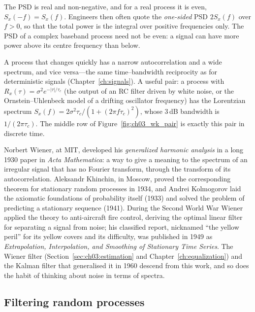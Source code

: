 The PSD is real and non-negative, and for a real process it is even, $S_x(-f)=S_x(f)$. Engineers then
often quote the \emph{one-sided} PSD $2S_x(f)$ over $f>0$, so that the total power is the integral over
positive frequencies only. The PSD of a complex baseband process need not be even: a signal can have
more power above its centre frequency than below.

A process that changes quickly has a narrow autocorrelation and a wide spectrum, and vice versa---the
same time--bandwidth reciprocity as for deterministic signals (Chapter~\ref{ch:signals}). A useful
pair: a process with $R_x(\tau)=\sigma^2e^{-|\tau|/\tau_c}$ (the output of an RC filter driven by white
noise, or the Ornstein--Uhlenbeck model of a drifting oscillator frequency) has the Lorentzian
spectrum $S_x(f)=2\sigma^2\tau_c/(1+(2\pi f\tau_c)^2)$, whose 3\,dB bandwidth is $1/(2\pi\tau_c)$. The
middle row of Figure~\ref{fig:ch03_wk_pair} is exactly this pair in discrete time.

\begin{history}
Norbert Wiener, at MIT, developed his \emph{generalized harmonic analysis} in a long 1930 paper in
\emph{Acta Mathematica}: a way to give a meaning to the spectrum of an irregular signal that has no
Fourier transform, through the transform of its autocorrelation. Aleksandr Khinchin, in Moscow,
proved the corresponding theorem for stationary random processes in 1934, and Andrei Kolmogorov laid
the axiomatic foundations of probability itself (1933) and solved the problem of predicting a
stationary sequence (1941). During the Second World War Wiener applied the theory to anti-aircraft
fire control, deriving the optimal linear filter for separating a signal from noise; his classified
report, nicknamed ``the yellow peril'' for its yellow covers and its difficulty, was published in 1949
as \emph{Extrapolation, Interpolation, and Smoothing of Stationary Time Series}. The Wiener filter
(Section~\ref{sec:ch03:estimation} and Chapter~\ref{ch:equalization}) and the Kalman filter that
generalised it in 1960 descend from this work, and so does the habit of thinking about noise in terms
of spectra.
\end{history}


\subsection{Filtering random processes}

